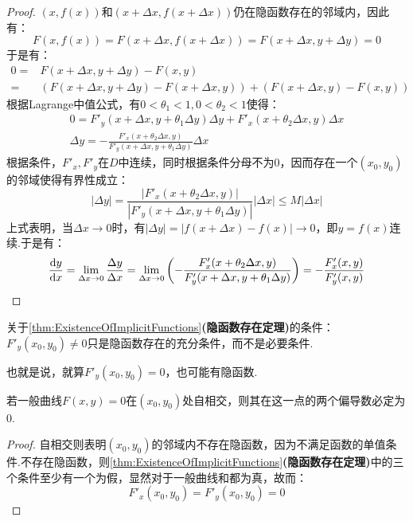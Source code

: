 \begin{proof}
    $(x,f(x))$和$(x+\Delta x,f(x+\Delta x))$仍在隐函数存在的邻域内，因此有：
    \[F(x,f(x)) = F(x+\Delta x,f(x+\Delta x)) = F(x+\Delta x,y+\Delta y) = 0\]
    于是有：
    \begin{align*}
        0 =& F(x+\Delta x,y+\Delta y) - F(x,y) \\
        =& (F(x+\Delta x,y+\Delta y) - F(x+\Delta x,y)) + (F(x+\Delta x,y) - F(x,y))
    \end{align*}
    根据Lagrange中值公式，有$0<\theta_1<1,0<\theta_2<1$使得：
    \begin{gather*}
        0 = F'_y(x+\Delta x,y+\theta_1\Delta y)\Delta y + F'_x(x+\theta_2\Delta x,y)\Delta x \\
        \Delta y = -\frac{F'_x(x+\theta_2\Delta x,y)}{F'_y(x+\Delta x,y+\theta_1\Delta y)}\Delta x
    \end{gather*}
    根据条件，$F'_x,F'_y$在$D$中连续，同时根据条件分母不为$0$，因而存在一个$(x_0,y_0)$的邻域使得有界性成立：
    \[|\Delta y| = \frac{|F'_x(x+\theta_2\Delta x,y)|}{|F'_y(x+\Delta x,y+\theta_1\Delta y)|}|\Delta x| \leqslant M|\Delta x|\]
    上式表明，当$\Delta x \to 0$时，有$|\Delta y| = |f(x+\Delta x) - f(x)| \to 0$，即$y = f(x)$连续.于是有：
    \[\dv{y}{x} = \lim_{\Delta x \to 0}\frac{\Delta y}{\Delta x} = \lim_{\Delta x \to 0}\left(-\frac{F'_x(x+\theta_2\Delta x,y)}{F'_y(x+\Delta x,y+\theta_1\Delta y)}\right) = -\frac{F'_x(x,y)}{F'_y(x,y)}\]
\end{proof}

\begin{mistake}
    关于\cref{thm:ExistenceOfImplicitFunctions}\textbf{(隐函数存在定理)}的条件：$F'_y(x_0,y_0)\neq 0$只是隐函数存在的充分条件，而不是必要条件.

    也就是说，就算$F'_y(x_0,y_0) = 0$，也可能有隐函数.
\end{mistake}

\begin{theorem}
    若一般曲线$F(x,y) = 0$在$(x_0,y_0)$处自相交，则其在这一点的两个偏导数必定为$0$.
\end{theorem}

\begin{proof}
    自相交则表明$(x_0,y_0)$的邻域内不存在隐函数，因为不满足函数的单值条件.不存在隐函数，则\cref{thm:ExistenceOfImplicitFunctions}\textbf{(隐函数存在定理)}中的三个条件至少有一个为假，显然对于一般曲线和都为真，故而：
    \[F'_x(x_0,y_0) = F'_y(x_0,y_0) = 0\]
\end{proof}

